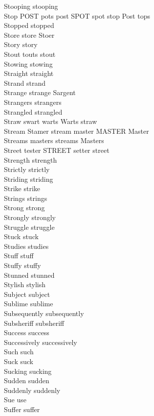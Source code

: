 Stooping stooping\\
Stop POST pots post SPOT spot stop Post tops\\
Stopped stopped\\
Store store Stoer\\
Story story\\
Stout touts stout\\
Stowing stowing\\
Straight straight\\
Strand strand\\
Strange strange Sargent\\
Strangers strangers\\
Strangled strangled\\
Straw swart warts Warts straw\\
Stream Stamer stream master MASTER Master\\
Streams masters streams Masters\\
Street tester STREET setter street\\
Strength strength\\
Strictly strictly\\
Striding striding\\
Strike strike\\
Strings strings\\
Strong strong\\
Strongly strongly\\
Struggle struggle\\
Stuck stuck\\
Studies studies\\
Stuff stuff\\
Stuffy stuffy\\
Stunned stunned\\
Stylish stylish\\
Subject subject\\
Sublime sublime\\
Subsequently subsequently\\
Subsheriff subsheriff\\
Success success\\
Successively successively\\
Such such\\
Suck suck\\
Sucking sucking\\
Sudden sudden\\
Suddenly suddenly\\
Sue use\\
Suffer suffer\\

